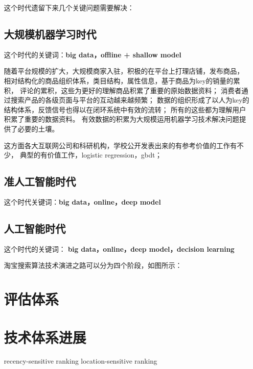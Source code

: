 这个时代遗留下来几个关键问题需要解决：
\begin{description}
	\item 
\end{description}

\subsection{大规模机器学习时代}
这个时代的关键词：\textbf{big data，offline + shallow model}

随着平台规模的扩大，大规模商家入驻，积极的在平台上打理店铺，发布商品，
相对结构化的商品组织体系，类目结构，属性信息，基于商品为key的销量的累积，
评论的累积，这些为更好的理解商品积累了重要的原始数据资料；
消费者通过搜索产品的各级页面与平台的互动越来越频繁；
数据的组织形成了以人为key的结构体系，反馈信号也得以在闭环系统中有效的流转；
所有的这些都为理解用户积累了重要的数据资料。
有效数据的积累为大规模运用机器学习技术解决问题提供了必要的土壤。

这方面各大互联网公司和科研机构，学校公开发表出来的有参考价值的工作有不少，
典型的有价值工作，logistic regression，gbdt； 




\subsection{准人工智能时代}
这个时代关键词：\textbf{big data，online，deep model }



\subsection{人工智能时代} 
这个时代的关键词： \textbf{big data，online，deep model，decision learning}

淘宝搜索算法技术演进之路可以分为四个阶段，如图所示： 




\section{评估体系} 


\section{技术体系进展} 
recency-sensitive ranking
location-sensitive ranking 





